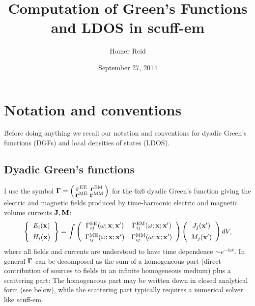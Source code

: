 \documentclass[letterpaper]{article}
\title {Computation of Green's Functions and LDOS in {\sc scuff-em}}
\author {Homer Reid}
\date {September 27, 2014}
\begin{document}
\pagestyle{myheadings}
\maketitle

\tableofcontents

\newpage
\section{Notation and conventions}

Before doing anything we recall our notation and conventions
for dyadic Green's functions (DGFs) and local densities of
states (LDOS).

\subsection*{Dyadic Green's functions}

I use the symbol
$\boldsymbol{\Gamma}=\left(\begin{smallmatrix}
\boldsymbol{\Gamma}^{\text{\scriptsize EE}} & \boldsymbol{\Gamma}^{\text{\scriptsize EM}} \\
\boldsymbol{\Gamma}^{\text{\scriptsize ME}} & \boldsymbol{\Gamma}^{\text{\scriptsize MM}}
\end{smallmatrix}\right)$ for the 6x6 dyadic Green's function
giving the electric and magnetic fields produced by
time-harmonic electric and magnetic volume currents
$\mathbf{J}, \mathbf{M}$:
$$
\left\{\begin{array}{c} E_i(\mathbf{x}) \\[5pt] H_i(\mathbf{x}) \end{array}\right\}
=
\int
\left(\begin{array}{cc}
 \Gamma_{ij}^{\text{\scriptsize EE}}(\omega; \mathbf{x}; \mathbf{x}^\prime) &
 \Gamma_{ij}^{\text{\scriptsize EM}}(\omega; \mathbf{x}; \mathbf{x}^\prime) \\[5pt]
 \Gamma_{ij}^{\text{\scriptsize ME}}(\omega; \mathbf{x}; \mathbf{x}^\prime) &
 \Gamma_{ij}^{\text{\scriptsize MM}}(\omega; \mathbf{x}; \mathbf{x}^\prime)
\end{array}\right)
\left(\begin{array}{c} J_j(\mathbf{x}^\prime) \\[5pt] M_j(\mathbf{x}^\prime) \end{array}\right)
dV,
$$
where all fields and currents are understood to have time dependence 
$\sim e^{-i\omega t}.$
In general $\boldsymbol{\Gamma}$ can be decomposed as the sum of a homogeneous
part (direct contribution of sources to fields in an infinite homogeneous
medium) plus a scattering part:
The homogeneous part may be written down in closed analytical form
(see below), while the scattering part typically requires a numerical
solver like {\sc scuff-em}.
\end{document}
